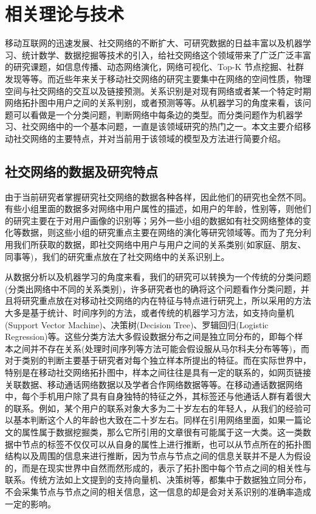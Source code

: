 \chapter{相关理论与技术}
\qquad 移动互联网的迅速发展、社交网络的不断扩大、可研究数据的日益丰富以及机器学习、统计数学、数据挖掘等技术的引入，给社交网络这个领域带来了广泛广泛丰富的研究课题，如信息传播、动态网络演化，网络可视化、Top-K 节点挖掘、社群发现等等。而近些年来关于移动社交网络的研究主要集中在网络的空间性质，物理空间与社交网络的交互以及链接预测。关系识别是对现有网络或者某一个特定时期网络拓扑图中用户之间的关系判别，或者预测等等。从机器学习的角度来看，该问题可以看做是一个分类问题，判断网络中每条边的类型。而分类问题作为机器学习、社交网络中的一个基本问题，一直是该领域研究的热门之一。本文主要介绍移动社交网络的主要特点，并对当前用于该领域的模型及方法进行简要介绍。

\section{社交网络的数据及研究特点}

由于当前研究者掌握研究社交网络的数据各种各样，因此他们的研究也全然不同。有些小组里面的数据多对网络中用户属性的描述，如用户的年龄，性别等，则他们的研究主要在于对用户画像的识别等；另外一些小组的数据如有社交网络整体的变化等数据，则这些小组的研究重点主要在网络的演化等研究领域等。而为了充分利用我们所获取的数据，即社交网络中用户与用户之间的关系类别(如家庭、朋友、同事等)，我们的研究重点放在了社交网络中的关系识别上。

从数据分析以及机器学习的角度来看，我们的研究可以转换为一个传统的分类问题(分类出网络中不同的关系类别)，许多研究者也的确将这个问题看作分类问题，并且将研究重点放在对移动社交网络的内在特征与特点进行研究上，所以采用的方法大多是基于统计、时间序列的方法，或者传统的机器学习方法，如支持向量机(Support Vector Machine)、决策树(Decision Tree)、罗辑回归(Logistic Regression)等。这些分类方法大多假设数据分布之间是独立同分布的，即每个样本之间并不存在关系(处理时间序列等方法可能会假设服从马尔科夫分布等等)，而对于类别的判断主要基于研究者对每个独立样本所提出的特征。而在实际世界中，特别是在移动社交网络拓扑图中，样本之间往往是具有一定的联系的，如网页链接关联数据、移动通话网络数据以及学者合作网络数据等等。在移动通话数据网络中，每个手机用户除了具有自身独特的特征之外，其标签还与他通话人群有着很大的联系。例如，某个用户的联系对象大多为二十岁左右的年轻人，从我们的经验可以基本判断这个人的年龄也大致在二十岁左右。同样在引用网络里面，如果一篇论文的属性属于数据挖掘类，那么它所引用的文章很有可能属于这一大类。这一类数据中节点的标签不仅仅可以从自身的属性上进行推断，也可以从节点所在的拓扑图结构以及周围的信息来进行推断，因为节点与节点之间的信息关联并不是人为假设的，而是在现实世界中自然而然形成的，表示了拓扑图中每个节点之间的相关性与联系。传统方法如上文提到的支持向量机、决策树等，都集中于数据独立同分布，不会采集节点与节点之间的相关信息，这一信息的却是会对关系识别的准确率造成一定的影响。

